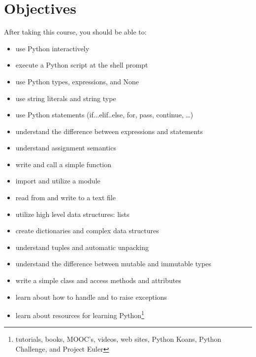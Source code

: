 \documentclass{tufte-handout}
\begin{document}
\section{Objectives}\label{sec:objectives}
After taking this course, you should be able to:
\begin{itemize} \itemsep1pt \parskip0pt 
  \item use Python interactively
  \item execute a Python script at the shell prompt
  \item use Python types, expressions, and None
  \item use string literals and string type %
  \item use Python statements (if...elif..else, for, pass, continue,
\ldots)
  \item understand the difference between expressions and statements
  \item understand assignment semantics
  \item write and call a simple function %
  \item import and utilize a module %
  \item read from and write to a text file
  \item utilize high level data structures: lists
  \item create dictionaries and complex data structures
  \item understand tuples and automatic unpacking
  \item understand the difference between mutable and immutable types
  \item write a simple class and access methods and attributes
  \item learn about how to handle and to raise exceptions
  \item learn about resources for learning Python\footnote{tutorials,
        books, MOOC's, videos, web sites, Python Koans,
        Python Challenge, and Project Euler}
\end{itemize}
\end{document}
